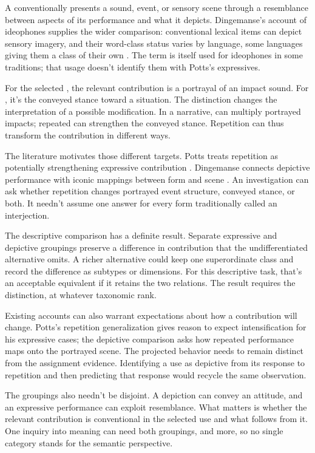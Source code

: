 \documentclass[12pt]{article}
\begin{document}
A  conventionally presents a sound, event, or sensory
scene through a resemblance between aspects of its performance and what
it depicts. Dingemanse's account of ideophones supplies the wider comparison:
conventional lexical items can depict sensory imagery, and their word-class
status varies by language, some languages giving them a class of their own
\citep[2--3]{dingemanse2018}.
The term  is itself used for ideophones in some traditions;
that usage doesn't identify them with Potts's expressives.

For the selected , the relevant contribution is a portrayal
of an impact sound. For , it's the conveyed stance toward
a situation. The distinction changes the interpretation of a possible
modification. In a narrative,  can
multiply portrayed impacts; repeated  can strengthen the
conveyed stance. Repetition can thus transform the contribution in
different ways.

The literature motivates those different targets. Potts treats repetition
as potentially strengthening expressive contribution \citep[181--182]{potts2007}.
Dingemanse connects depictive performance with iconic mappings between
form and scene \citep[10--11]{dingemanse2018}. An investigation can
ask whether repetition changes portrayed event structure, conveyed stance,
or both. It needn't assume one answer for every form traditionally
called an interjection.

The descriptive comparison has a definite result. Separate expressive
and depictive groupings preserve a difference in contribution that the
undifferentiated alternative omits. A richer alternative could keep one
superordinate class and record the difference as subtypes or dimensions.
For this descriptive task, that's an acceptable equivalent if it retains
the two relations. The result requires the distinction, at whatever
taxonomic rank.

Existing accounts can also warrant expectations about how a contribution
will change. Potts's repetition generalization gives reason to expect
intensification for his expressive cases; the depictive comparison asks
how repeated performance maps onto the portrayed scene. The projected
behavior needs to remain distinct from the assignment evidence. Identifying
a use as depictive from its response to repetition and then predicting
that response would recycle the same observation.

The groupings also needn't be disjoint. A depiction can convey an attitude,
and an expressive performance can exploit resemblance. What matters is
whether the relevant contribution is conventional in the selected use and
what follows from it. One inquiry into meaning can need both groupings,
and more, so no single category stands for the semantic perspective.
\end{document}
